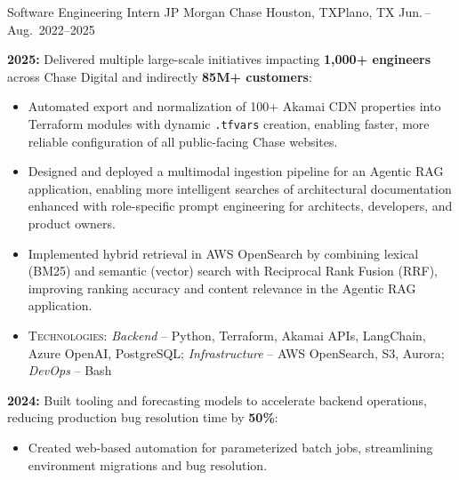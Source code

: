 

\begin{cventries}
\cventry
    {Software Engineering Intern} %
    {JP Morgan Chase} %
    {Houston, TX\newline Plano, TX} %
    {Jun.\,--\,Aug.\ 2022--2025} %
    {
        \begin{cvitems}
          \item {\textbf{2025:} Delivered multiple large-scale initiatives impacting \textbf{1,000+ engineers} across Chase Digital and indirectly \textbf{85M+ customers}:
          \begin{itemize}
            \item Automated export and normalization of 100+ Akamai CDN properties into Terraform modules with dynamic \texttt{.tfvars} creation, enabling faster, more reliable configuration of all public-facing Chase websites.
            \item Designed and deployed a multimodal ingestion pipeline for an Agentic RAG application, enabling more intelligent searches of architectural documentation enhanced with role-specific prompt engineering for architects, developers, and product owners.
            \item Implemented hybrid retrieval in AWS OpenSearch by combining lexical (BM25) and semantic (vector) search with Reciprocal Rank Fusion (RRF), improving ranking accuracy and content relevance in the Agentic RAG application.
            \item \textsc{Technologies}: \textit{Backend} – Python, Terraform, Akamai APIs, LangChain, Azure OpenAI, PostgreSQL; \textit{Infrastructure} – AWS OpenSearch, S3, Aurora; \textit{DevOps} – Bash
          \end{itemize}
          }
          \item { \textbf{2024:} Built tooling and forecasting models to accelerate backend operations, reducing production bug resolution time by \textbf{50\%}:
          \begin{itemize}
            \item Created web-based automation for parameterized batch jobs, streamlining environment migrations and bug resolution.

\end{itemize}}
\end{cvitems}}
\end{cventries}
